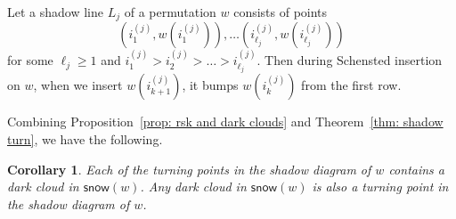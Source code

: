 \documentclass[10pt]{amsart}
\theoremstyle{plain}
\newtheorem{cor}[cor]{Corollary}
\theoremstyle{plain}
\theoremstyle{definition}
\theoremstyle{definition}
\theoremstyle{definition}
\theoremstyle{plain}
\theoremstyle{plain}
\theoremstyle{plain}
\theoremstyle{plain}
\theoremstyle{plain}
\theoremstyle{remark}
\theoremstyle{remark}
\theoremstyle{plain}
\theoremstyle{plain}
\newcommand{\snow}{\mathsf{snow}}
\begin{document}
\begin{ourthm}\label{thm: shadow turn}
Let a shadow line $L_j$ of a permutation $w$ consists of points
\[
\left(i^{(j)}_1,w(i^{(j)}_1)\right),\dots \left(i^{(j)}_{\ell_j},w(i^{(j)}_{\ell_j})\right)
\]
for some $\ell_j \geqslant 1$ and $i^{(j)}_1>i^{(j)}_2>\dots>i^{(j)}_{\ell_j}$. 
Then during Schensted insertion on $w$, when we insert $w(i^{(j)}_{k+1})$,
it bumps $w(i^{(j)}_{k})$ from the first row.
\end{ourthm}
 
Combining Proposition~\ref{prop: rsk and dark clouds} and Theorem~\ref{thm: shadow turn}, we have the following.

\begin{cor}
Each of the turning points in the shadow diagram of $w$ contains a dark cloud in $\snow(w)$. Any dark cloud in $\snow(w)$ is also a turning point in the shadow diagram of $w$.
\end{cor}
\end{document}
